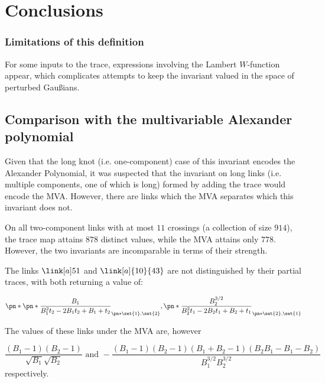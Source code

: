 \chapter{Conclusions}\label{ch:conclusions}

\subsection{Limitations of this definition}\label{sec:limitations}
For some inputs to the trace, expressions involving the Lambert $W$-function
appear, which complicates attempts to keep the invariant valued in the space of
perturbed Gaußians.

\section{Comparison with the multivariable Alexander polynomial}
\label{sec:compare_MVA}

Given that the long knot (i.e. one-component) case of this invariant
encodes the Alexander Polynomial, it was suspected that the invariant on long
links (i.e. multiple components, one of which is long) formed by adding the
trace would encode the \ac{MVA}. However, there are links which the \ac{MVA}
separates which this invariant does not.

On all two-component links with at most $11$ crossings (a collection of size
$914$), the trace map attains $878$ distinct values, while the MVA attains only
$778$. However, the two invariants are incomparable in terms of their strength.

The links $\link[a]51$ and $\link[a]{10}{43}$ are not distinguished by their
partial traces, with both returning a value of:

\begin{equation}
        \pn*{
                \pn*{
                        \frac{B_1}{B_1^2 t_2 -2 B_1 t_2 +B_1+t_2}
                }_{\pn*{\set{1},\set{2}}},
                \pn*{
                        \frac{B_2^{3/2}}{B_2^2 t_1 -2 B_2 t_1 +B_2+t_1}
                }_{\pn*{\set{2},\set{1}}}
}
\end{equation}

The values of these links under the \ac{MVA} are, however

\begin{equation}
        \frac{\left(B_1-1\right) \left(B_2-1\right)}{\sqrt{B_1} \sqrt{B_2}}
        \text{ and }
        -\frac{\left(B_1-1\right) \left(B_2-1\right) \left(B_1+B_2-1\right)
        \left(B_2 B_1-B_1-B_2\right)}{B_1^{3/2} B_2^{3/2}}
\end{equation}
respectively.

